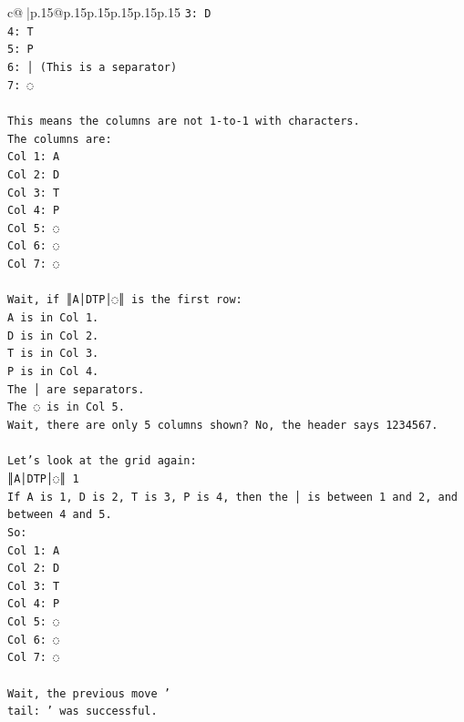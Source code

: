 \documentclass{article}
\begin{document}
{\begin{supertabular}{c@{$\;$}|p{.15\linewidth}@{}p{.15\linewidth}p{.15\linewidth}p{.15\linewidth}p{.15\linewidth}p{.15\linewidth}}
{{{\texttt{3: D} \\
\texttt{4: T} \\
\texttt{5: P} \\
\texttt{6: │ (This is a separator)} \\
\texttt{7: ◌} \\
\\ 
\texttt{This means the columns are not 1{-}to{-}1 with characters.} \\
\texttt{The columns are:} \\
\texttt{Col 1: A} \\
\texttt{Col 2: D} \\
\texttt{Col 3: T} \\
\texttt{Col 4: P} \\
\texttt{Col 5: ◌} \\
\texttt{Col 6: ◌} \\
\texttt{Col 7: ◌} \\
\\ 
\texttt{Wait, if ║A│DTP│◌║ is the first row:} \\
\texttt{A is in Col 1.} \\
\texttt{D is in Col 2.} \\
\texttt{T is in Col 3.} \\
\texttt{P is in Col 4.} \\
\texttt{The │ are separators.} \\
\texttt{The ◌ is in Col 5.} \\
\texttt{Wait, there are only 5 columns shown? No, the header says 1234567.} \\
\\ 
\texttt{Let's look at the grid again:} \\
\texttt{║A│DTP│◌║ 1} \\
\texttt{If A is 1, D is 2, T is 3, P is 4, then the │ is between 1 and 2, and between 4 and 5.} \\
\texttt{So:} \\
\texttt{Col 1: A} \\
\texttt{Col 2: D} \\
\texttt{Col 3: T} \\
\texttt{Col 4: P} \\
\texttt{Col 5: ◌} \\
\texttt{Col 6: ◌} \\
\texttt{Col 7: ◌} \\
\\ 
\texttt{Wait, the previous move '} \\
\texttt{tail: ' was successful.} \\
}}}
\end{supertabular}}
\end{document}

